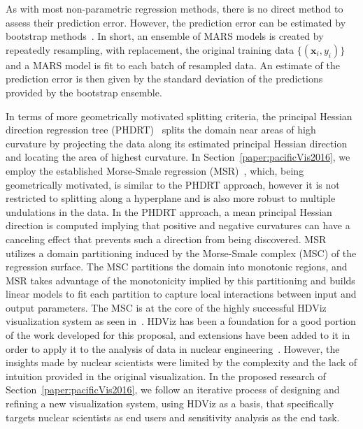 As with most non-parametric regression methods, there is no direct method to assess their prediction error.
%
However, the prediction error can be estimated by bootstrap methods~\cite{DavisonHinkley1997}.
%
In short, an ensemble of MARS models is created by repeatedly resampling, with replacement, the original training data $\{ (\mathbf{x}_i, y_i) \}$ and a MARS model is fit to each batch of resampled data.
%
An estimate of the prediction error is then given by the standard deviation of the predictions provided by the bootstrap ensemble.

In terms of more geometrically motivated splitting criteria, the principal Hessian direction regression tree (PHDRT)~\cite{LiLueChen2000} splits the domain near areas of high curvature by projecting the data along its estimated principal Hessian direction and locating the area of highest curvature.
%
In Section~\ref{paper:pacificVis2016}, we employ the established Morse-Smale regression (MSR)~\cite{GerberRubelBremer2011}, which, being geometrically motivated, is similar to the PHDRT approach, however it is not restricted to splitting along a hyperplane and is also more robust to multiple undulations in the data.
%
In the PHDRT approach, a mean principal Hessian direction is computed implying that positive and negative curvatures can have a canceling effect that prevents such a direction from being discovered.
%
MSR utilizes a domain partitioning induced by the Morse-Smale complex (MSC) of the regression surface.
%
The MSC partitions the domain into monotonic regions, and MSR takes advantage of the monotonicity implied by this partitioning and builds linear models to fit each partition to capture local interactions between input and output parameters.
%
The MSC is at the core of the highly successful HDViz visualization system as seen in~\cite{GerberBremerPascucci2010}.
%
HDViz has been a foundation for a good portion of the work developed for this proposal, and extensions have been added to it in order to apply it to the analysis of data in nuclear engineering~\cite{MaljovecLiuWang2015, MaljovecWangMandelli2013a, MaljovecWangPascucci2013}.
%
However, the insights made by nuclear scientists were limited by the complexity and the lack of intuition provided in the original visualization.
%
In the proposed research of Section~\ref{paper:pacificVis2016}, we follow an iterative process of designing and refining a new visualization system, using HDViz as a basis, that specifically targets nuclear scientists as end users and sensitivity analysis as the end task.
%


